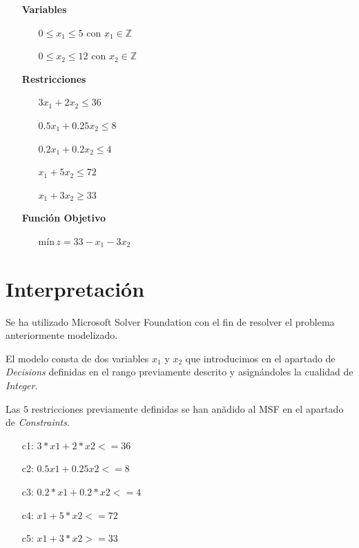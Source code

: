 \documentclass[a4paper,12pt]{article}
\begin{document}
\begin{itemize}

\item[\textbf{Variables}]
	\begin{itemize}
		\item[] $0 \leq x_1 \leq 5 \text{ con } x_1\in \mathds{Z}$
		\item[] $0 \leq x_2 \leq 12 \text{ con } x_2\in \mathds{Z}$
	\end{itemize}
	
\item[\textbf{Restricciones}]

\begin{itemize}

		\item[] $3x_1 + 2x_2 \leq 36$
		\item[] $0.5x_1 + 0.25x_2 \leq 8$
		\item[] $0.2x_1 + 0.2x_2 \leq 4$
		\item[] $x_1 + 5x_2 \leq 72$
		\item[] $x_1 + 3x_2 \geq 33$
\end{itemize}
	
	
\item[\textbf{Funci\'on Objetivo}]
	\begin{itemize}
			\item[] $\text{m\'in}\,z = 33 - x_1 - 3x_2$
	\end{itemize}
\end{itemize}

\pagebreak

\section{Interpretaci\'on}
Se ha utilizado Microsoft Solver Foundation con el fin de resolver el problema anteriormente modelizado. 

El modelo consta de dos variables $x_1$ y $x_2$ que introducimos en el apartado de \textit{Decisions} definidas en el rango previamente descrito y asign\'andoles la cualidad de \textit{Integer}.

Las $5$ restricciones previamente definidas se han an\~adido al MSF en el apartado de \textit{Constraints}.

\begin{itemize}
\item[c1:] $3*x1 + 2*x2 <= 36$
\item[c2:] $0.5x1 + 0.25x2 <= 8$
\item[c3:] $0.2*x1 + 0.2*x2 <= 4$
\item[c4:] $x1 + 5*x2 <= 72$
\item[c5:] $x1 + 3*x2 >= 33$
\end{itemize}
\end{document}
